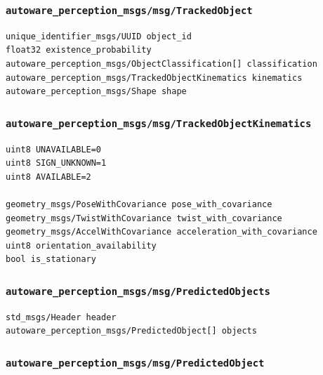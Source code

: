\documentclass[
]{article}
\begin{document}
\subsubsection{\texorpdfstring{\texttt{autoware\_perception\_msgs/msg/TrackedObject}}{autoware\_perception\_msgs/msg/TrackedObject}}\label{autoware_perception_msgsmsgtrackedobject}

\begin{verbatim}
unique_identifier_msgs/UUID object_id
float32 existence_probability
autoware_perception_msgs/ObjectClassification[] classification
autoware_perception_msgs/TrackedObjectKinematics kinematics
autoware_perception_msgs/Shape shape
\end{verbatim}

\subsubsection{\texorpdfstring{\texttt{autoware\_perception\_msgs/msg/TrackedObjectKinematics}}{autoware\_perception\_msgs/msg/TrackedObjectKinematics}}\label{autoware_perception_msgsmsgtrackedobjectkinematics}

\begin{verbatim}
uint8 UNAVAILABLE=0
uint8 SIGN_UNKNOWN=1
uint8 AVAILABLE=2

geometry_msgs/PoseWithCovariance pose_with_covariance
geometry_msgs/TwistWithCovariance twist_with_covariance
geometry_msgs/AccelWithCovariance acceleration_with_covariance
uint8 orientation_availability
bool is_stationary
\end{verbatim}

\subsubsection{\texorpdfstring{\texttt{autoware\_perception\_msgs/msg/PredictedObjects}}{autoware\_perception\_msgs/msg/PredictedObjects}}\label{autoware_perception_msgsmsgpredictedobjects}

\begin{verbatim}
std_msgs/Header header
autoware_perception_msgs/PredictedObject[] objects
\end{verbatim}

\subsubsection{\texorpdfstring{\texttt{autoware\_perception\_msgs/msg/PredictedObject}}{autoware\_perception\_msgs/msg/PredictedObject}}\label{autoware_perception_msgsmsgpredictedobject}
\end{document}
